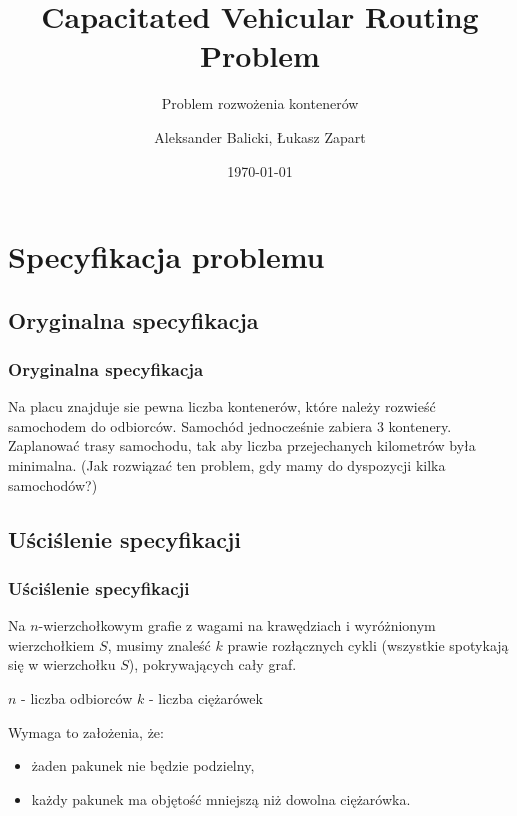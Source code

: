 \documentclass{beamer}
\title{Capacitated Vehicular Routing Problem}
\subtitle{Problem rozwożenia kontenerów}
\author{Aleksander Balicki, Łukasz Zapart}
\institute{Instytut Informatyki}
\date{\today}
\begin{document}
\mode*
\begin{frame}
\titlepage
\end{frame}

\begin{frame}
\tableofcontents[hideallsubsections]
\end{frame}


\section{Specyfikacja problemu}

\begin{frame}
\subsection{Oryginalna specyfikacja}
\frametitle{Oryginalna specyfikacja}
	Na placu znajduje sie pewna liczba kontenerów, które należy rozwieść samochodem do odbiorców. Samochód jednocześnie zabiera 3 kontenery. Zaplanować trasy samochodu, tak aby liczba przejechanych kilometrów była minimalna. (Jak rozwiązać ten problem, gdy mamy do dyspozycji kilka samochodów?)
\end{frame}

\begin{frame}
\subsection{Uściślenie specyfikacji}
\frametitle{Uściślenie specyfikacji}
	Na $n$-wierzchołkowym grafie z wagami na krawędziach i wyróżnionym wierzchołkiem $S$, musimy znaleść $k$ prawie rozłącznych cykli (wszystkie spotykają się w wierzchołku $S$), pokrywających cały graf.

	$n$ - liczba odbiorców
	$k$ - liczba ciężarówek

	Wymaga to założenia, że:
	\begin{itemize}
		\item żaden pakunek nie będzie podzielny,
		\item każdy pakunek ma objętość mniejszą niż dowolna ciężarówka.
	\end{itemize}
\end{frame}
\end{document}
